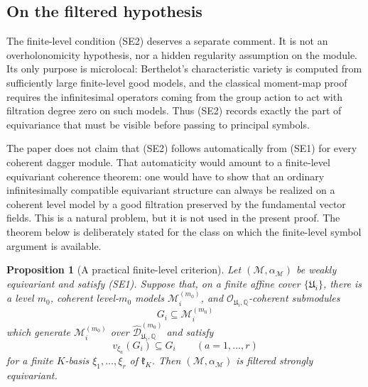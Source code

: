 \documentclass[11pt]{amsart}
\theoremstyle{plain}
\newtheorem{proposition}{Proposition}[section]
\theoremstyle{definition}
\theoremstyle{remark}
\begin{document}
\subsection{On the filtered hypothesis}
\label{subsec:filtered-hypothesis}

The finite-level condition \textup{(SE2)} deserves a separate comment.  It is
not an overholonomicity hypothesis, nor a hidden regularity assumption on the
module.  Its only purpose is microlocal: Berthelot's characteristic variety is
computed from sufficiently large finite-level good models, and the classical
moment-map proof requires the infinitesimal operators coming from the group
action to act with filtration degree zero on such models.  Thus \textup{(SE2)}
records exactly the part of equivariance that must be visible before passing to
principal symbols.

The paper does not claim that \textup{(SE2)} follows automatically from
\textup{(SE1)} for every coherent dagger module.  That automaticity would amount
to a finite-level equivariant coherence theorem: one would have to show that an
ordinary infinitesimally compatible equivariant structure can always be realized
on a coherent level model by a good filtration preserved by the fundamental
vector fields.  This is a natural problem, but it is not used in the present
proof.  The theorem below is deliberately stated for the class on which the
finite-level symbol argument is available.

\begin{proposition}[A practical finite-level criterion]
\label{prop:practical-SE2-criterion}
Let \((\mathcal M,\alpha_{\mathcal M})\) be weakly equivariant and satisfy
\textup{(SE1)}.  Suppose that, on a finite affine cover
\(\{\mathfrak U_i\}\), there is a level \(m_0\), coherent level-\(m_0\) models
\(\mathcal M_i^{(m_0)}\), and \(\mathcal O_{\mathfrak U_i,\mathbb Q}\)-coherent
submodules
\[
  G_i\subseteq \mathcal M_i^{(m_0)}
\]
which generate \(\mathcal M_i^{(m_0)}\) over
\(\widehat{\mathscr D}^{(m_0)}_{\mathfrak U_i,\mathbb Q}\) and satisfy
\[
  v_{\xi_a}(G_i)\subseteq G_i
  \qquad(a=1,\ldots,r)
\]
for a finite \(K\)-basis \(\xi_1,\ldots,\xi_r\) of \(\mathfrak k_K\).  Then
\((\mathcal M,\alpha_{\mathcal M})\) is filtered strongly equivariant.
\end{proposition}
\end{document}
